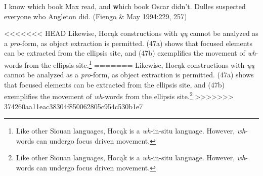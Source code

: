 \documentclass[output=paper]{LSP/langsci}
\begin{document}
\begin{exe}
\ex
\begin{xlist}
\ex
I know which book Max read, and {\textbf which book} Oscar didn't.
\ex
Dulles suspected everyone who Angleton did. (Fiengo \& May 1994:229, 257)
\end{xlist}
\end{exe}

<<<<<<< HEAD
Likewise, Hocąk constructions with \emph{ųų} cannot be analyzed as a \emph{pro}-form, as object extraction is permitted. (47a) shows that focused elements can be extracted from the ellipsis site, and (47b) exemplifies the movement of \emph{wh}-words from the ellipsis site.\footnote{Like other Siouan languages, Hocąk is a \emph{wh}-in-situ language. However, \emph{wh}-words can undergo focus driven movement.}
=======
Likewise, Hoc\k{a}k constructions with \emph{\k{u}\k{u}} cannot be analyzed as a \emph{pro}-form, as object extraction is permitted. (47a) shows that focused elements can be extracted from the ellipsis site, and (47b) exemplifies the movement of \emph{wh}-words from the ellipsis site.\footnote{Like other Siouan languages, Hoc\k{a}k is a \emph{wh}-in-situ language. However, \emph{wh}-words can undergo focus driven movement.}
>>>>>>> 374260aa11eac38304f850062805c954c530b1e7
\end{document}
